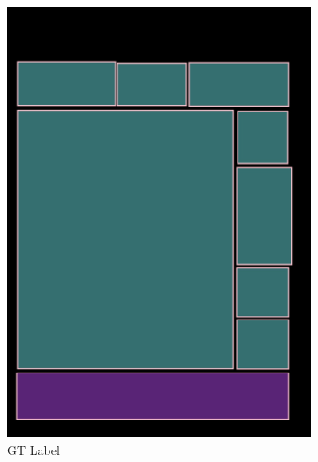 \documentclass[aspectratio=1610]{beamer}
\begin{document}
\begin{frame}
\begin{figure}
\begin{subfigure}{.25\textwidth}
  \includegraphics[width=0.99\linewidth, clip=true, trim = 0mm 0mm 0mm 0mm]{figures/bbox/JIefsDa.jpg}
  \caption{GT Label}
\end{subfigure}%
\begin{subfigure}{.25\textwidth}
  \centering

\end{subfigure}
\end{figure}
\end{frame}
\end{document}
